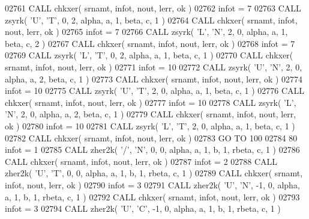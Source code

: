 \begin{DoxyCode}
02761       \textcolor{keyword}{CALL }chkxer( srnamt, infot, nout, lerr, ok )
02762       infot = 7
02763       \textcolor{keyword}{CALL }zsyrk( \textcolor{stringliteral}{'U'}, \textcolor{stringliteral}{'T'}, 0, 2, alpha, a, 1, beta, c, 1 )
02764       \textcolor{keyword}{CALL }chkxer( srnamt, infot, nout, lerr, ok )
02765       infot = 7
02766       \textcolor{keyword}{CALL }zsyrk( \textcolor{stringliteral}{'L'}, \textcolor{stringliteral}{'N'}, 2, 0, alpha, a, 1, beta, c, 2 )
02767       \textcolor{keyword}{CALL }chkxer( srnamt, infot, nout, lerr, ok )
02768       infot = 7
02769       \textcolor{keyword}{CALL }zsyrk( \textcolor{stringliteral}{'L'}, \textcolor{stringliteral}{'T'}, 0, 2, alpha, a, 1, beta, c, 1 )
02770       \textcolor{keyword}{CALL }chkxer( srnamt, infot, nout, lerr, ok )
02771       infot = 10
02772       \textcolor{keyword}{CALL }zsyrk( \textcolor{stringliteral}{'U'}, \textcolor{stringliteral}{'N'}, 2, 0, alpha, a, 2, beta, c, 1 )
02773       \textcolor{keyword}{CALL }chkxer( srnamt, infot, nout, lerr, ok )
02774       infot = 10
02775       \textcolor{keyword}{CALL }zsyrk( \textcolor{stringliteral}{'U'}, \textcolor{stringliteral}{'T'}, 2, 0, alpha, a, 1, beta, c, 1 )
02776       \textcolor{keyword}{CALL }chkxer( srnamt, infot, nout, lerr, ok )
02777       infot = 10
02778       \textcolor{keyword}{CALL }zsyrk( \textcolor{stringliteral}{'L'}, \textcolor{stringliteral}{'N'}, 2, 0, alpha, a, 2, beta, c, 1 )
02779       \textcolor{keyword}{CALL }chkxer( srnamt, infot, nout, lerr, ok )
02780       infot = 10
02781       \textcolor{keyword}{CALL }zsyrk( \textcolor{stringliteral}{'L'}, \textcolor{stringliteral}{'T'}, 2, 0, alpha, a, 1, beta, c, 1 )
02782       \textcolor{keyword}{CALL }chkxer( srnamt, infot, nout, lerr, ok )
02783       \textcolor{keywordflow}{GO TO} 100
02784    80 infot = 1
02785       \textcolor{keyword}{CALL }zher2k( \textcolor{stringliteral}{'/'}, \textcolor{stringliteral}{'N'}, 0, 0, alpha, a, 1, b, 1, rbeta, c, 1 )
02786       \textcolor{keyword}{CALL }chkxer( srnamt, infot, nout, lerr, ok )
02787       infot = 2
02788       \textcolor{keyword}{CALL }zher2k( \textcolor{stringliteral}{'U'}, \textcolor{stringliteral}{'T'}, 0, 0, alpha, a, 1, b, 1, rbeta, c, 1 )
02789       \textcolor{keyword}{CALL }chkxer( srnamt, infot, nout, lerr, ok )
02790       infot = 3
02791       \textcolor{keyword}{CALL }zher2k( \textcolor{stringliteral}{'U'}, \textcolor{stringliteral}{'N'}, -1, 0, alpha, a, 1, b, 1, rbeta, c, 1 )
02792       \textcolor{keyword}{CALL }chkxer( srnamt, infot, nout, lerr, ok )
02793       infot = 3
02794       \textcolor{keyword}{CALL }zher2k( \textcolor{stringliteral}{'U'}, \textcolor{stringliteral}{'C'}, -1, 0, alpha, a, 1, b, 1, rbeta, c, 1 )

\end{DoxyCode}
